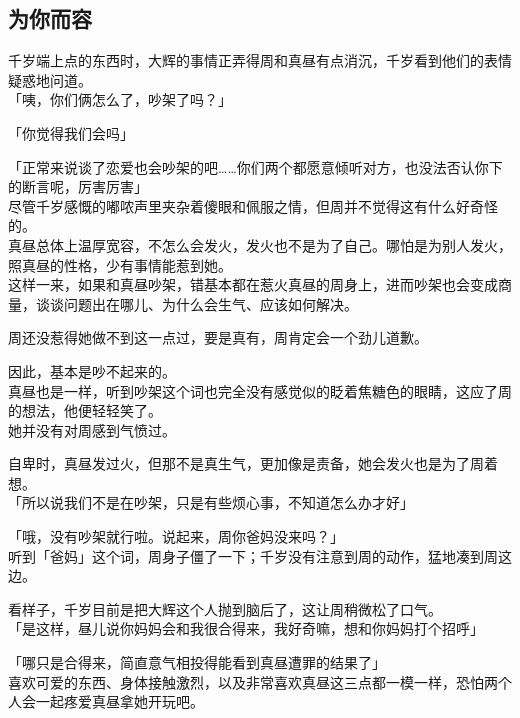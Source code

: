 \subsection{为你而容}

千岁端上点的东西时，大辉的事情正弄得周和真昼有点消沉，千岁看到他们的表情疑惑地问道。\\

「咦，你们俩怎么了，吵架了吗？」

「你觉得我们会吗」

「正常来说谈了恋爱也会吵架的吧……你们两个都愿意倾听对方，也没法否认你下的断言呢，厉害厉害」\\

尽管千岁感慨的嘟哝声里夹杂着傻眼和佩服之情，但周并不觉得这有什么好奇怪的。\\

真昼总体上温厚宽容，不怎么会发火，发火也不是为了自己。哪怕是为别人发火，照真昼的性格，少有事情能惹到她。\\

这样一来，如果和真昼吵架，错基本都在惹火真昼的周身上，进而吵架也会变成商量，谈谈问题出在哪儿、为什么会生气、应该如何解决。

周还没惹得她做不到这一点过，要是真有，周肯定会一个劲儿道歉。

因此，基本是吵不起来的。\\

真昼也是一样，听到吵架这个词也完全没有感觉似的眨着焦糖色的眼睛，这应了周的想法，他便轻轻笑了。\\

她并没有对周感到气愤过。

自卑时，真昼发过火，但那不是真生气，更加像是责备，她会发火也是为了周着想。\\

「所以说我们不是在吵架，只是有些烦心事，不知道怎么办才好」

「哦，没有吵架就行啦。说起来，周你爸妈没来吗？」\\

听到「爸妈」这个词，周身子僵了一下；千岁没有注意到周的动作，猛地凑到周这边。

看样子，千岁目前是把大辉这个人抛到脑后了，这让周稍微松了口气。\\

「是这样，昼儿说你妈妈会和我很合得来，我好奇嘛，想和你妈妈打个招呼」

「哪只是合得来，简直意气相投得能看到真昼遭罪的结果了」\\

喜欢可爱的东西、身体接触激烈，以及非常喜欢真昼这三点都一模一样，恐怕两个人会一起疼爱真昼拿她开玩吧。

